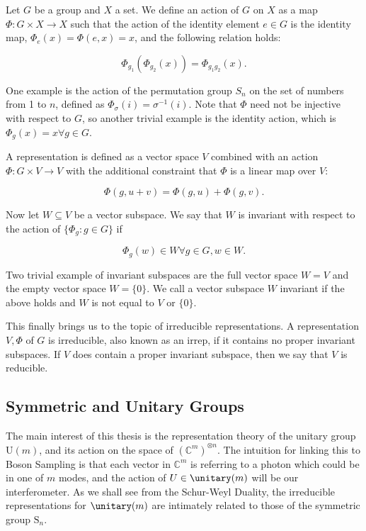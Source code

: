 Let $G$ be a group and $X$ a set. We define an action of $G$ on $X$ as a map $\Phi\colon G\times X \rightarrow X$ such that the action of the identity element $e\in G$ is the identity map, $\Phi_e(x) = \Phi(e, x) = x$, and the following relation holds:

\begin{equation}
\Phi_{g_1}(\Phi_{g_2}(x)) = \Phi_{g_1g_2}(x).
\end{equation}

One example is the action of the permutation group $S_n$ on the set of numbers from 1 to $n$, defined as $\Phi_\sigma(i) = \sigma^{-1}(i)$. Note that $\Phi$ need not be injective with respect to $G$, so another trivial example is the identity action, which is $\Phi_g(x) = x \forall g \in G$.

A representation is defined as a vector space $V$ combined with an action $\Phi: G \times V \rightarrow V$ with the additional constraint that $\Phi$ is a linear map over $V$:

\begin{equation}
\Phi(g, u+v) = \Phi(g, u) + \Phi(g, v).
\end{equation}

Now let $W \subseteq V$ be a vector subspace. We say that $W$ is invariant with respect to the action of $\{\Phi_g\colon g\in G\}$ if

\begin{equation}
\Phi_g(w) \in W \forall g \in G, w \in W.
\end{equation}

Two trivial example of invariant subspaces are the full vector space $W=V$ and the empty vector space $W=\{0\}$. We call a vector subspace $W$ invariant if the above holds and $W$ is not equal to $V$ or $\{0\}$.

This finally brings us to the topic of irreducible representations. A representation $V, \Phi$ of $G$ is irreducible, also known as an irrep, if it contains no proper invariant subspaces. If $V$ does contain a proper invariant subspace, then we say that $V$ is reducible.

\subsection{Symmetric and Unitary Groups}

The main interest of this thesis is the representation theory of the unitary group U$(m)$, and its action on the space of $(\mathbb{C}^{m})^{\otimes n}$. The intuition for linking this to Boson Sampling is that each vector in $\mathbb{C}^m$ is referring to a photon which could be in one of $m$ modes, and the action of $U \in \unitary(m)$ will be our interferometer.
As we shall see from the Schur-Weyl Duality, the irreducible representations for $\unitary(m)$ are intimately related to those of the symmetric group $\textrm{S}_n$.

